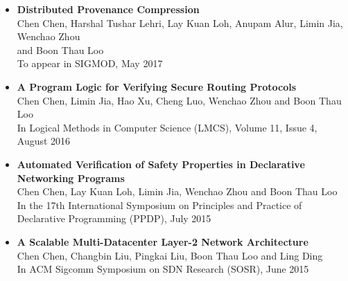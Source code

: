 \vspace{15pt} %
\begin{itemize} \itemsep -2pt %
\item {\bf Distributed Provenance Compression} \\
Chen Chen, Harshal Tushar Lehri, Lay Kuan Loh, Anupam Alur, Limin Jia,
Wenchao Zhou \\ and Boon Thau Loo\\
To appear in SIGMOD, May 2017\\
\item {\bf A Program Logic for Verifying Secure Routing Protocols} \\
Chen Chen, Limin Jia, Hao Xu, Cheng Luo, Wenchao Zhou and Boon Thau
Loo\\
In Logical Methods in Computer Science (LMCS), Volume 11, Issue 4, August 2016\\
\item {\bf Automated Verification of Safety Properties in Declarative Networking
    Programs} \\
Chen Chen, Lay Kuan Loh, Limin Jia, Wenchao Zhou and Boon Thau Loo\\
In the 17th International Symposium on Principles and Practice of Declarative
Programming (PPDP), July 2015\\
\item {\bf A Scalable Multi-Datacenter Layer-2 Network Architecture} \\
Chen Chen, Changbin Liu, Pingkai Liu, Boon Thau Loo and Ling Ding\\
In ACM Sigcomm Symposium on SDN Research (SOSR), June 2015\\



\end{itemize}
